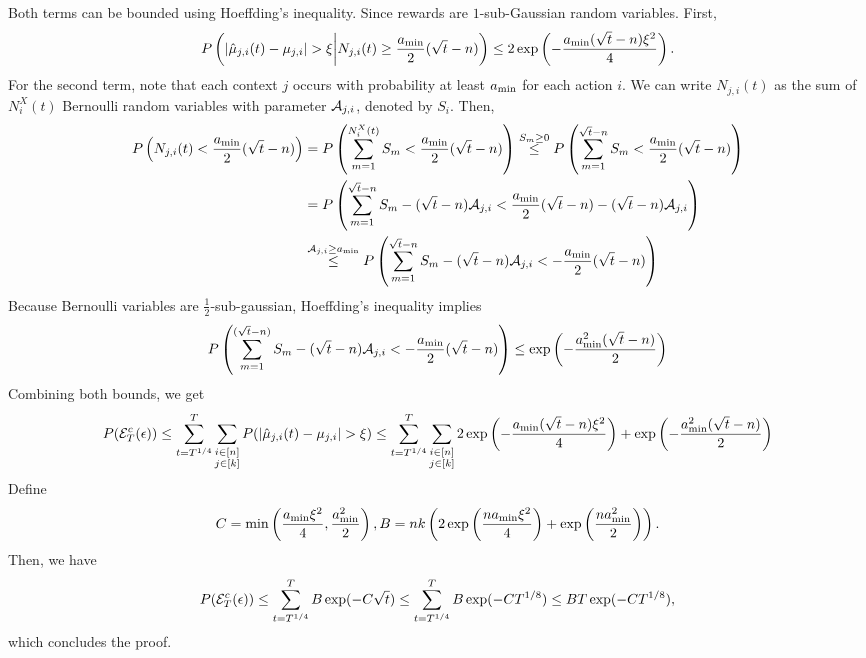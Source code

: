         Both terms can be bounded using Hoeffding's inequality. Since rewards are $1$-sub-Gaussian random variables. First,
        \begin{align*}
            P \left(\vert \hat{\mu}_{j,i}(t) - \mu_{j,i} \vert > \xi \bigg| N_{j,i}(t) \geq \frac{a_{\min}}{2} (\sqrt{t} - n) \right) \leq 2\exp \left( - \frac{a_{\min} (\sqrt{t} - n)\xi^2}{4} \right).
        \end{align*}
        For the second term, note that each context $j$ occurs with probability at least $a_{\min}$ for each action $i$.
        We can write $N_{j,i}(t)$ as the sum of $N^{X}_{i}(t)$ Bernoulli random variables with parameter $\mathcal{A}_{j,i}$, denoted by $S_i$. Then,
        \begin{align*}
            P \left( N_{j,i}(t) < \frac{a_{\min}}{2} (\sqrt{t} - n) \right) &= P \left( \sum_{m = 1}^{N^{X}_{i}(t)} S_m < \frac{a_{\min}}{2} (\sqrt{t} - n) \right)
            \overset{S_m \geq 0}{\leq} P \left( \sum_{m = 1}^{\sqrt{t} - n} S_m < \frac{a_{\min}}{2} (\sqrt{t} - n)\right)  \\
            &= P \left( \sum_{m = 1}^{\sqrt{t} - n} S_m - (\sqrt{t} - n) \mathcal{A}_{j, i} < \frac{a_{\min}}{2} (\sqrt{t} - n) - (\sqrt{t} - n) \mathcal{A}_{j, i}\right)    \\
            &\overset{\mathcal{A}_{j, i} \geq a_{\min}}{\leq} P \left( \sum_{m = 1}^{\sqrt{t} - n} S_m - (\sqrt{t} - n) \mathcal{A}_{j, i} < -\frac{a_{\min}}{2} (\sqrt{t} - n)\right) 
        \end{align*}
        Because Bernoulli variables are $\frac{1}{2}$-sub-gaussian, Hoeffding’s inequality implies
        \begin{align*}
            P \left( \sum_{m = 1}^{(\sqrt{t} - n)} S_m - (\sqrt{t} - n) \mathcal{A}_{j, i} < -\frac{a_{\min}}{2} (\sqrt{t} - n)\right)  \leq \exp \left( -\frac{a_{\min}^2(\sqrt{t} - n)}{2} \right )
        \end{align*}
         Combining both bounds, we get
        \begin{align*}
             P(\mathcal{E}^c_T(\epsilon)) \leq \sum_{t = T^{1/4}}^T \sum_{\substack{i \in [n] \\ j \in [k]}} P(|\hat{\mu}_{j,i}(t) - \mu_{j,i}| > \xi) 
                                   \leq \sum_{t = T^{1/4}}^T \sum_{\substack{i \in [n] \\ j \in [k]}}  2\exp \left( - \frac{a_{\min} (\sqrt{t} - n)\xi^2}{4} \right) + \exp \left( -\frac{a_{\min}^2(\sqrt{t} - n)}{2}  \right )
        \end{align*}
        Define
        \begin{align*}
            C = \min \left( \frac{a_{\min} \xi^2}{4}, \frac{a_{\min}^2}{2} \right), B = nk \left( 2\exp \left( \frac{n a_{\min} \xi^2}{4} \right) + \exp \left( \frac{n a_{\min}^2}{2} \right) \right).
        \end{align*}
        Then, we have
        \begin{align*}
            P(\mathcal{E}_T^c(\epsilon)) \leq \sum_{t = T^{1/4}}^T B \exp (-C\sqrt{t}) \leq \sum_{t = T^{1/4}}^T B \exp (-CT^{1/8}) \leq BT \exp (-CT^{1/8}),
        \end{align*}
        which concludes the proof.

